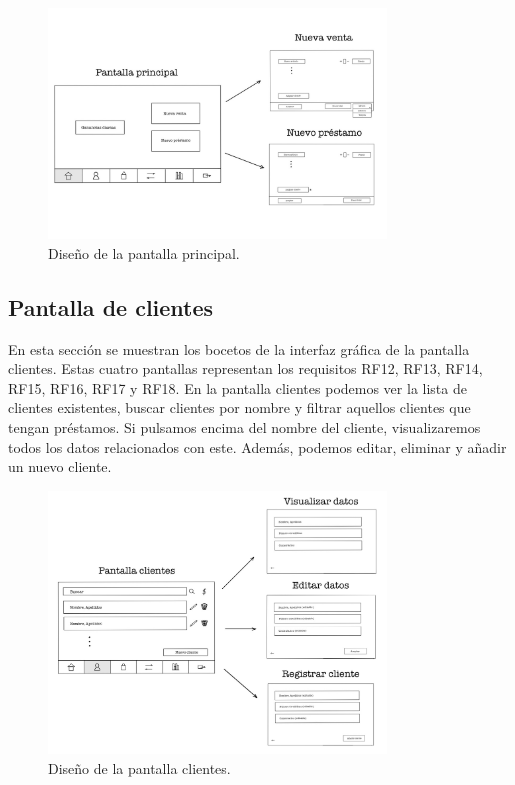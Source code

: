 \begin{figure}[ht]
	\centering
	\includegraphics[width=0.8\textwidth, angle=270]{imagenes/pantalla_principal.JPG}
	\caption{Diseño de la pantalla principal.}
	\label{fig:pantallaprincipal}
\end{figure}

\newpage

\subsection{Pantalla de clientes}

En esta sección se muestran los bocetos de la interfaz gráfica de la pantalla clientes. Estas cuatro pantallas representan los requisitos RF12, RF13, RF14, RF15, RF16, RF17 y RF18. En la pantalla clientes podemos ver la lista de clientes existentes, buscar clientes por nombre y filtrar aquellos clientes que tengan préstamos. Si pulsamos encima del nombre del cliente, visualizaremos todos los datos relacionados con este. Además, podemos editar, eliminar y añadir un nuevo cliente. 


\begin{figure}[ht]
	\centering
	\includegraphics[width=0.8\textwidth, angle=270]{imagenes/pantalla_clientes.JPG}
	\caption{Diseño de la pantalla clientes.}
	\label{fig:pantallaclientes}
\end{figure}

